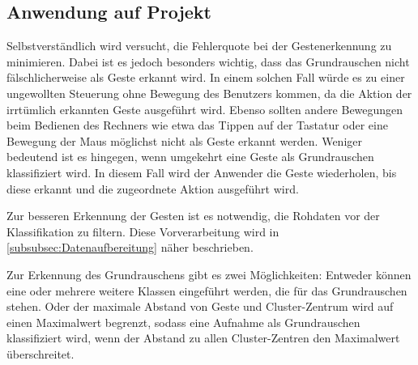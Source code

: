 \subsection{Anwendung auf Projekt}
Selbstverständlich wird versucht, die Fehlerquote bei der Gestenerkennung zu minimieren. Dabei ist es jedoch besonders wichtig, dass das Grundrauschen nicht fälschlicherweise als Geste erkannt wird. In einem solchen Fall würde es zu einer ungewollten Steuerung ohne Bewegung des Benutzers kommen, da die Aktion der irrtümlich erkannten Geste ausgeführt wird. Ebenso sollten andere Bewegungen beim Bedienen des Rechners wie etwa das Tippen auf der Tastatur oder eine Bewegung der Maus möglichst nicht als Geste erkannt werden.
Weniger bedeutend ist es hingegen, wenn umgekehrt eine Geste als Grundrauschen klassifiziert wird. In diesem Fall wird der Anwender die Geste wiederholen, bis diese erkannt und die zugeordnete Aktion ausgeführt wird.

Zur besseren Erkennung der Gesten ist es notwendig, die Rohdaten vor der Klassifikation zu filtern. Diese Vorverarbeitung wird in \autoref{subsubsec:Datenaufbereitung} näher beschrieben.

Zur Erkennung des Grundrauschens gibt es zwei Möglichkeiten: Entweder können eine oder mehrere weitere Klassen eingeführt werden, die für das Grundrauschen stehen. Oder der maximale Abstand von Geste und Cluster-Zentrum wird auf einen Maximalwert begrenzt, sodass
eine Aufnahme als Grundrauschen klassifiziert wird, wenn der Abstand zu allen Cluster-Zentren den Maximalwert überschreitet.


